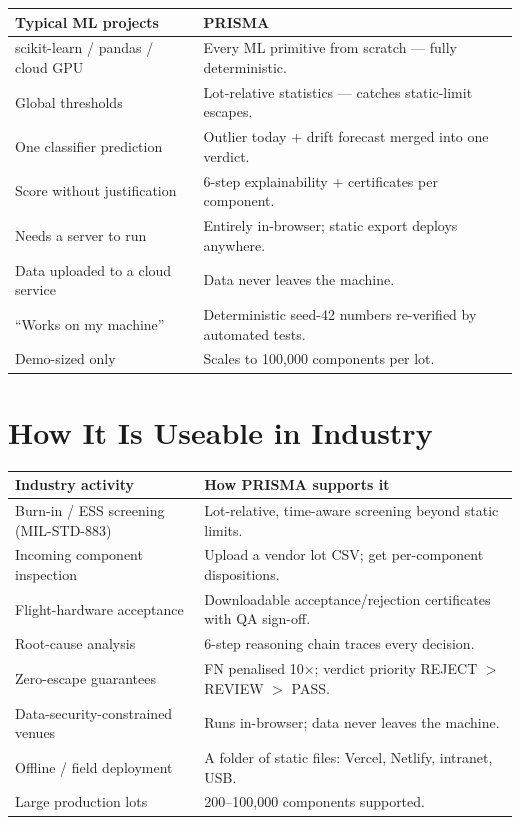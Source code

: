 \documentclass[11pt,a4paper]{article}
\begin{document}
\begin{center}
\begin{tabular}{@{}p{6.2cm}p{8.4cm}@{}}
\toprule
\textbf{Typical ML projects} & \textbf{PRISMA}\\
\midrule
scikit-learn / pandas / cloud GPU & Every ML primitive from scratch --- fully deterministic.\\
Global thresholds & Lot-relative statistics --- catches static-limit escapes.\\
One classifier prediction & Outlier today + drift forecast merged into one verdict.\\
Score without justification & 6-step explainability + certificates per component.\\
Needs a server to run & Entirely in-browser; static export deploys anywhere.\\
Data uploaded to a cloud service & Data never leaves the machine.\\
``Works on my machine'' & Deterministic seed-42 numbers re-verified by automated tests.\\
Demo-sized only & Scales to 100{,}000 components per lot.\\
\bottomrule
\end{tabular}
\end{center}

\section{How It Is Useable in Industry}

\begin{center}
\begin{longtable}{@{}p{5cm}p{9.6cm}@{}}
\toprule
\textbf{Industry activity} & \textbf{How PRISMA supports it}\\
\midrule
\endhead
Burn-in / ESS screening (MIL-STD-883) & Lot-relative, time-aware screening beyond static limits.\\
Incoming component inspection & Upload a vendor lot CSV; get per-component dispositions.\\
Flight-hardware acceptance & Downloadable acceptance/rejection certificates with QA sign-off.\\
Root-cause analysis & 6-step reasoning chain traces every decision.\\
Zero-escape guarantees & FN penalised 10$\times$; verdict priority REJECT $>$ REVIEW $>$ PASS.\\
Data-security-constrained venues & Runs in-browser; data never leaves the machine.\\
Offline / field deployment & A folder of static files: Vercel, Netlify, intranet, USB.\\
Large production lots & 200--100{,}000 components supported.\\
\bottomrule
\end{longtable}
\end{center}
\end{document}
